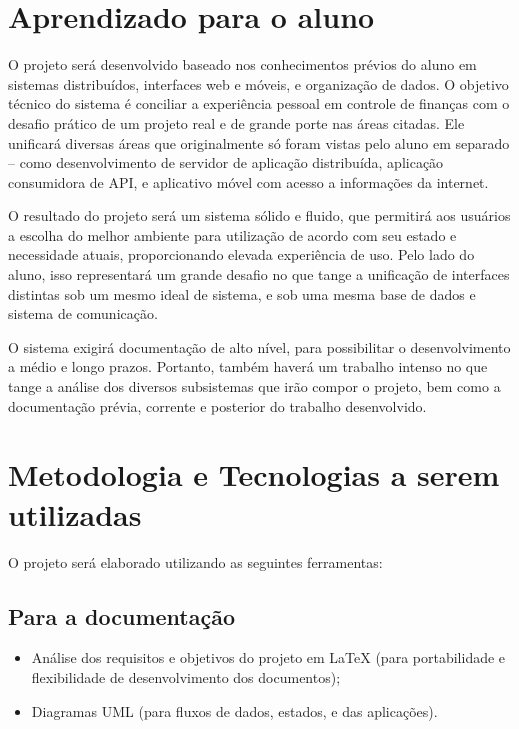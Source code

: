 \documentclass[a4paper]{abnt}
\begin{document}
\section{Aprendizado para o aluno}

O projeto será desenvolvido baseado nos conhecimentos prévios do aluno em sistemas distribuídos, interfaces web e móveis, e organização de dados. O objetivo técnico do sistema é conciliar a experiência pessoal em controle de finanças com o desafio prático de um projeto real e de grande porte nas áreas citadas. Ele unificará diversas áreas que originalmente só foram vistas pelo aluno em separado – como desenvolvimento de servidor de aplicação distribuída, aplicação consumidora de API, e aplicativo móvel com acesso a informações da internet.

O resultado do projeto será um sistema sólido e fluido, que permitirá aos usuários a escolha do melhor ambiente para utilização de acordo com seu estado e necessidade atuais, proporcionando elevada experiência de uso. Pelo lado do aluno, isso representará um grande desafio no que tange a unificação de interfaces distintas sob um mesmo ideal de sistema, e sob uma mesma base de dados e sistema de comunicação.

O sistema exigirá documentação de alto nível, para possibilitar o desenvolvimento a médio e longo prazos. Portanto, também haverá um trabalho intenso no que tange a análise dos diversos subsistemas que irão compor o projeto, bem como a documentação prévia, corrente e posterior do trabalho desenvolvido.

\section{Metodologia e Tecnologias a serem utilizadas}
O projeto será elaborado utilizando as seguintes ferramentas:

\subsection{Para a documentação}
\begin{itemize}
	\item Análise dos requisitos e objetivos do projeto em \LaTeX{} (para portabilidade e flexibilidade de desenvolvimento dos documentos);
	\item Diagramas UML (para fluxos de dados, estados, e das aplicações).
\end{itemize}
	
\end{document}
